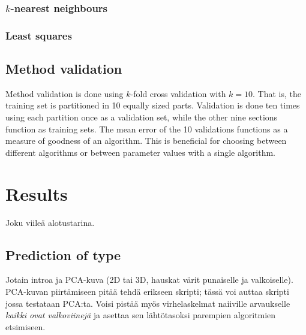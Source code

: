 \documentclass[twoside]{article}
\begin{document}
\begin{multicols}{2}
\subsubsection{$k$-nearest neighbours}

\subsubsection{Least squares}



\subsection{Method validation}

Method validation is done using $k$-fold 
cross validation with $k = 10$. That is, the training set is partitioned in 10 equally sized parts. 
Validation is done ten times using each partition once as a validation set, while the other nine
sections function as training sets. The mean error of the 10 validations functions as a measure
of goodness of an algorithm. This is beneficial for choosing between different algorithms or
between parameter values with a single algorithm.

\section{Results}

Joku viileä alotustarina.

\subsection{Prediction of type}

Jotain introa ja PCA-kuva (2D tai 3D, hauskat värit punaiselle ja valkoiselle). PCA-kuvan piirtämiseen pitää tehdä erikseen skripti; tässä voi auttaa skripti jossa testataan PCA:ta.
Voisi pistää myös virhelaskelmat naiiville arvaukselle \emph{kaikki ovat valkoviinejä} ja asettaa sen lähtötasoksi parempien algoritmien etsimiseen.


\end{multicols}
\end{document}
